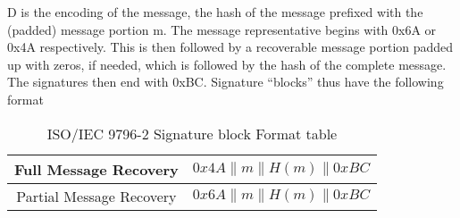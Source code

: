 \documentclass[]{final_report}
\theoremstyle{definition}
\begin{document}
D is the encoding of the message, the hash of the message prefixed with the (padded) message portion m. The message representative begins with 0x6A or 0x4A respectively. This is then followed by a recoverable message portion padded up with zeros, if needed, which is followed by the hash of the complete message. The signatures then end with 0xBC. Signature “blocks” thus have the following format
\begin{table}[h]
    \centering
    \begin{tabular}{|c|c|}
    \hline
    Full Message Recovery & $0x4A\|m\|H(m)\|0xBC$ \\
    \hline
    Partial Message Recovery & $0x6A\|m\|H(m)\|0xBC$ \\
    \hline
    \end{tabular}
    \caption{ISO/IEC 9796-2 Signature block Format table}
    \label{tab:sig_block_tab}
\end{table}
\end{document}
